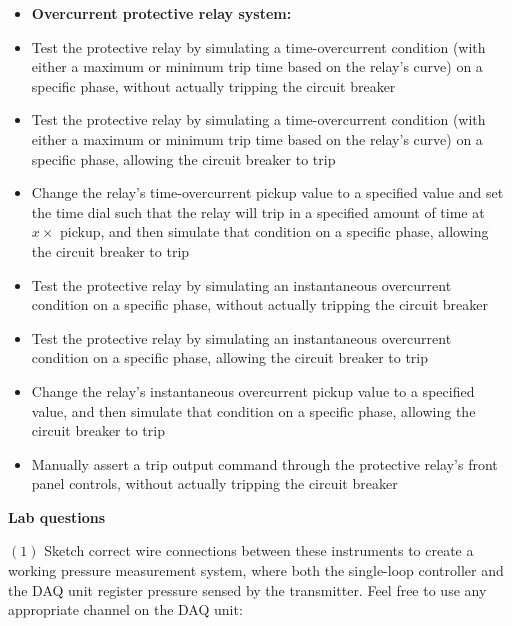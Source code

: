 \vskip 10pt

\filbreak

\begin{itemize}
\item{} {\bf Overcurrent protective relay system:}
\item{} Test the protective relay by simulating a time-overcurrent condition (with either a maximum or minimum trip time based on the relay's curve) on a specific phase, without actually tripping the circuit breaker
\item{} Test the protective relay by simulating a time-overcurrent condition (with either a maximum or minimum trip time based on the relay's curve) on a specific phase, allowing the circuit breaker to trip
\item{} Change the relay's time-overcurrent pickup value to a specified value and set the time dial such that the relay will trip in a specified amount of time at $x \times$ pickup, and then simulate that condition on a specific phase, allowing the circuit breaker to trip
\item{} Test the protective relay by simulating an instantaneous overcurrent condition on a specific phase, without actually tripping the circuit breaker
\item{} Test the protective relay by simulating an instantaneous overcurrent condition on a specific phase, allowing the circuit breaker to trip
\item{} Change the relay's instantaneous overcurrent pickup value to a specified value, and then simulate that condition on a specific phase, allowing the circuit breaker to trip
\item{} Manually assert a trip output command through the protective relay's front panel controls, without actually tripping the circuit breaker
\end{itemize}












\vfil \eject

\noindent
{\bf Lab questions}

\vskip 20pt

\item{$(1)$} Sketch correct wire connections between these instruments to create a working pressure measurement system, where both the single-loop controller and the DAQ unit register pressure sensed by the transmitter.  Feel free to use any appropriate channel on the DAQ unit:

